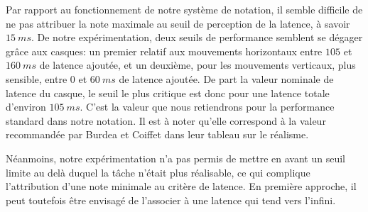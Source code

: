 	\par Par rapport au fonctionnement de notre système de notation, il semble difficile de ne pas attribuer la note maximale au seuil de perception de la latence, à savoir $15~ms$. De notre expérimentation, deux seuils de performance semblent se dégager grâce aux casques: un premier relatif aux mouvements horizontaux entre $105$ et $160~ms$ de latence ajoutée, et un deuxième, pour les mouvements verticaux, plus sensible, entre $0$ et $60~ms$ de latence ajoutée. De part la valeur nominale de latence du casque, le seuil le plus critique est donc pour une latence totale d'environ $105~ms$. C'est la valeur que nous retiendrons pour la performance standard dans notre notation. Il est à noter qu'elle correspond à la valeur recommandée par Burdea et Coiffet dans leur tableau sur le réalisme.
	
	\par Néanmoins, notre expérimentation n'a pas permis de mettre en avant un seuil limite au delà duquel la tâche n'était plus réalisable, ce qui complique l'attribution d'une note minimale au critère de latence. En première approche, il peut toutefois être envisagé de l'associer à une latence qui tend vers l'infini.